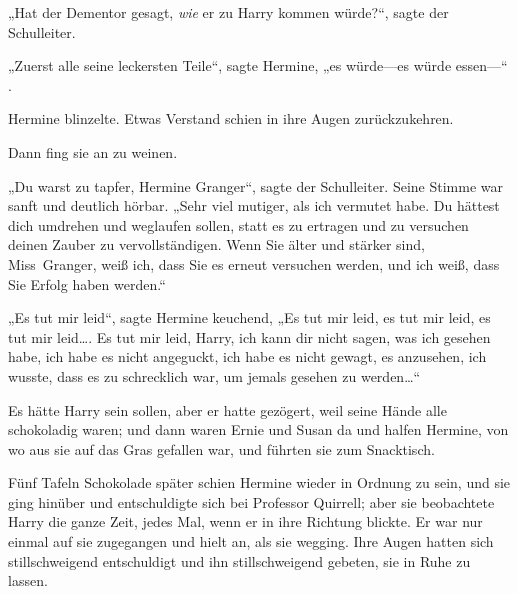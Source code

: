 „Hat der Dementor gesagt, \emph{wie} er zu Harry kommen würde?“, sagte der Schulleiter.

„Zuerst alle seine leckersten Teile“, sagte Hermine, „es würde—es würde essen—“ .

Hermine blinzelte. Etwas Verstand schien in ihre Augen zurückzukehren.

Dann fing sie an zu weinen.

„Du warst zu tapfer, Hermine Granger“, sagte der Schulleiter. Seine Stimme war sanft und deutlich hörbar. „Sehr viel mutiger, als ich vermutet habe. Du hättest dich umdrehen und weglaufen sollen, statt es zu ertragen und zu versuchen deinen Zauber zu vervollständigen. Wenn Sie älter und stärker sind, Miss~Granger, weiß ich, dass Sie es erneut versuchen werden, und ich weiß, dass Sie Erfolg haben werden.“

„Es tut mir leid“, sagte Hermine keuchend, „Es tut mir leid, es tut mir leid, es tut mir leid…. Es tut mir leid, Harry, ich kann dir nicht sagen, was ich gesehen habe, ich habe es nicht angeguckt, ich habe es nicht gewagt, es anzusehen, ich wusste, dass es zu schrecklich war, um jemals gesehen zu werden…“

Es hätte Harry sein sollen, aber er hatte gezögert, weil seine Hände alle schokoladig waren; und dann waren Ernie und Susan da und halfen Hermine, von wo aus sie auf das Gras gefallen war, und führten sie zum Snacktisch.

Fünf Tafeln Schokolade später schien Hermine wieder in Ordnung zu sein, und sie ging hinüber und entschuldigte sich bei Professor Quirrell; aber sie beobachtete Harry die ganze Zeit, jedes Mal, wenn er in ihre Richtung blickte. Er war nur einmal auf sie zugegangen und hielt an, als sie wegging. Ihre Augen hatten sich stillschweigend entschuldigt und ihn stillschweigend gebeten, sie in Ruhe zu lassen.

